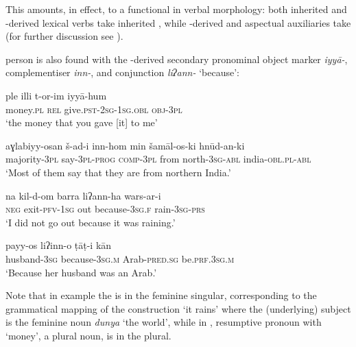 \documentclass[output=paper]{langsci/langscibook}
\begin{document}
This amounts, in effect, to a functional  in verbal morphology: both inherited and -derived lexical verbs take inherited  , while -derived  and aspectual auxiliaries take   (for further discussion see \citealt{Matras2015}).

 person  is also found with the -derived secondary pronominal object marker \textit{iyyā-}, complementiser \textit{inn-}, and conjunction \textit{liʔann-} ‘because’:

\ea \gll   ple illi t-or-im iyyā-hum\\
       money.\textsc{pl} \textsc{rel} give.\textsc{pst-2sg-1sg.obl} \textsc{obj-3pl}\\
\glt   ‘the money that you gave [it] to me’ \label{ple}
\z

\ea\label{most}
\gll aɣlabiyy-osan š-ad-i inn-hom min šamāl-os-ki hnūd-an-ki\\
     majority-\textsc{3pl} say-\textsc{3pl-prog} \textsc{comp-3pl} from        north-\textsc{3sg-abl} india-\textsc{obl.pl-abl}\\
\glt   ‘Most of them say that they are from northern India.’
\z

\ea \gll na kil-d-om barra liʔann-ha wars-ar-i\\
       \textsc{neg} exit-\textsc{pfv-1sg} out because-\textsc{3sg.f} rain-\textsc{3sg-prs}\\
\glt   ‘I did not go out because it was raining.’\label{barra}
\z

\ea \gll     payy-os liʔinn-o ṭāṭ-i kān\\
       husband-\textsc{3sg} because-\textsc{3sg.m} Arab-\textsc{pred.sg} be.\textsc{prf.3sg.m}\\
\glt   ‘Because her husband was an Arab.’
\z

Note that in example  the  is in the feminine singular, corresponding to the grammatical mapping of the   construction ‘it rains’ where the (underlying) subject is the feminine noun \textit{dunya} ‘the world’, while in , resumptive pronoun  with ‘money’, a plural noun, is in the plural.
\end{document}
